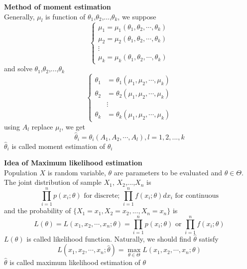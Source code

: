 \documentclass[10pt,a4paper,oneside]{beamer}
\begin{document}
\begin{frame}
\vspace{0.15cm}
{\bfseries Method of moment estimation} 
\vspace{0.15cm}
\\Generally, $\mu_l$ is function of $\theta_1$,$\theta_{2}$,...,$\theta_{k}$, we suppose
\[
\left\{\begin{array}{c}{\mu_{1}=\mu_{1}\left(\theta_{1}, \theta_{2}, \cdots, \theta_{k}\right)} \\ {\mu_{2}=\mu_{2}\left(\theta_{1}, \theta_{2}, \cdots, \theta_{k}\right)} \\ {\vdots} \\ {\mu_{k}=\mu_{k}\left(\theta_{1}, \theta_{2}, \cdots, \theta_{k}\right)}\end{array}\right.
\]
and solve $\theta_1$,$\theta_{2}$,...,$\theta_{k}$
\[
\left\{\begin{aligned} \theta_{1} &=\theta_{1}\left(\mu_{1}, \mu_{2}, \cdots, \mu_{k}\right) \\ \theta_{2} &=\theta_{2}\left(\mu_{1}, \mu_{2}, \cdots, \mu_{k}\right) \\ & \vdots \\ \theta_{k} &=\theta_{k}\left(\mu_{1}, \mu_{2}, \cdots, \mu_{k}\right) \end{aligned}\right.
\]
using $A_l$ replace $\mu_l$, we get
\[
\hat{\theta}_{i}=\theta_{i}\left(A_{1}, A_{2}, \cdots, A_{l}\right), l=1,2,..., k
\]
$\hat{\theta}_i$ is called moment estimation of $\theta_i $
\end{frame}
\begin{frame}
\vspace{0.3cm}
{\bfseries Idea of Maximum likelihood estimation} 
\vspace{0.3cm}
\\Population $X$ is random variable, $\theta$ are parameters to be evaluated and $\theta\in\Theta$. The joint distribution of sample $X_1$, $X_2$,...,$X_n$ is
\[
\prod_{i=1}^{n} p\left(x_{i} ; \theta\right) \text{ for discrete;  } \prod_{i=1}^{n} f\left(x_{i} ; \theta\right)dx_i \text{ for continuous}
\]
and the probability of $\{X_1=x_1,X_2=x_2,...,X_n=x_n\}$ is
\[
L(\theta)=L\left(x_{1}, x_{2}, \cdots, x_{n} ; \theta\right)=\prod_{i=1}^{n} p\left(x_{i} ; \theta\right) \text{  or  } \prod_{i=1}^{n} f\left(x_{i} ; \theta\right) 
\]
$L(\theta)$ is called likelihood function. Naturally, we should find $\hat{\theta}$ satisfy
\[
L\left(x_{1}, x_{2}, \cdots, x_{n} ; \hat{\theta}\right)=\max _{\theta \in \Theta} L\left(x_{1}, x_{2}, \cdots, x_{n} ; \theta\right)
\]
$\hat{\theta}$ is called maximum likelihood estimation of $\theta$
\end{frame}
\end{document}
